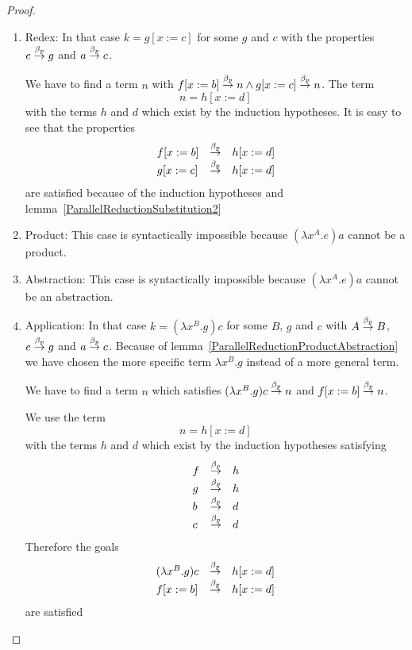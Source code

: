 \begin{theorem}
\begin{proof}
\begin{enumerate}
\begin{enumerate}
            \item Redex: In that case $k = g[x:=c]$ for some $g$ and $c$ with the
            properties $e \stackrel{\beta_p}{\to} g$ and $a \stackrel{\beta_p}{\to} c$.

            We have to find a term $n$ with $f[x:=b] \stackrel{\beta_p}{\to} n \land g[x:=c]
            \stackrel{\beta_p}{\to} n$. The term
            $$
                n = h[x:=d]
            $$
            with the terms $h$ and $d$ which exist by the induction hypotheses. It
            is easy to see that the properties
            $$
            \begin{array}{lll}
                f[x:=b] &\stackrel{\beta_p}{\to}& h[x:=d]
                \\
                g[x:=c] &\stackrel{\beta_p}{\to}& h[x:=d]
            \end{array}
            $$
            are satisfied because of the induction hypotheses and
            lemma~\ref{ParallelReductionSubstitution2}


            \item Product: This case is syntactically impossible because
            $(\lambda x^A.e) a$ cannot be a product.


            \item Abstraction: This case is syntactically impossible because
            $(\lambda x^A.e) a$ cannot be an abstraction.


            \item Application: In that case $k = (\lambda x^B. g) c$ for some
            $B$, $g$ and $c$ with $A \stackrel{\beta_p}{\to} B$, $e \stackrel{\beta_p}{\to} g$ and $a \stackrel{\beta_p}{\to}
            c$. Because of lemma~\ref{ParallelReductionProductAbstraction} we
            have chosen the more specific term $\lambda x^B. g$ instead of a
            more general term.

            We have to find a term $n$ which satisfies $(\lambda x^B. g) c
            \stackrel{\beta_p}{\to} n$ and $f[x:=b] \stackrel{\beta_p}{\to} n$.

            We use the term
            $$
                n = h[x:=d]
            $$
            with the terms $h$ and $d$ which exist by the induction hypotheses
            satisfying
            $$
            \begin{array}{lll}
                f &\stackrel{\beta_p}{\to}& h
                \\
                g &\stackrel{\beta_p}{\to}& h
                \\
                b &\stackrel{\beta_p}{\to}& d
                \\
                c &\stackrel{\beta_p}{\to}& d
            \end{array}
            $$
            Therefore the goals
            $$
            \begin{array}{lll}
                (\lambda x^B.g) c &\stackrel{\beta_p}{\to}& h[x:=d]
                \\
                f[x:=b] &\stackrel{\beta_p}{\to}& h[x:=d]
            \end{array}
            $$
            are satisfied
            \end{enumerate}



\end{enumerate}
\end{proof}
\end{theorem}
